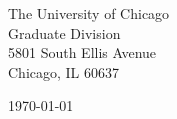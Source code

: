 \begin{minipage}{0.49\textwidth}
\begin{flushleft}
\noindent
The University of Chicago \\
Graduate Division \\
5801 South Ellis Avenue\\
Chicago, IL 60637\\

\end{flushleft}
\end{minipage}
\begin{minipage}{0.47\textwidth}
\begin{flushright}
\today
\end{flushright}
\end{minipage} \\

\newcommand{\univ}{The University of Chicago}
\newcommand{\univshort}{UChicago}
\newcommand{\degree}{Ph.D.}
\newcommand{\dept}{Computer Science}



